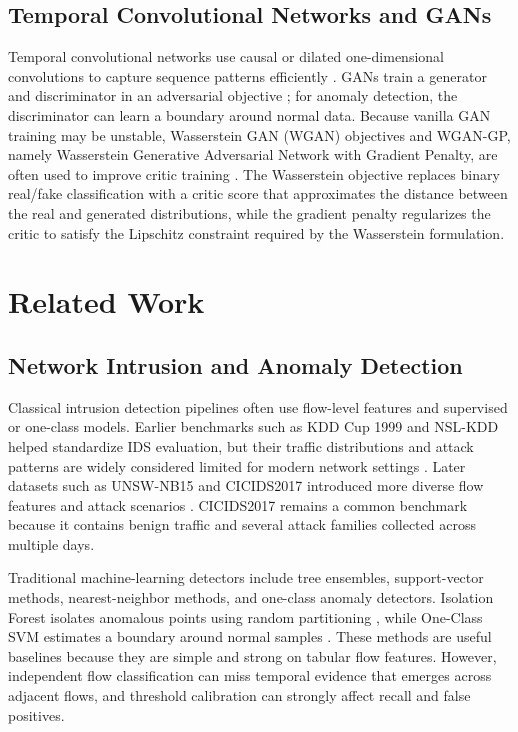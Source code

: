 \documentclass[conference]{IEEEtran}
\begin{document}
\subsection{Temporal Convolutional Networks and GANs}
Temporal convolutional networks use causal or dilated one-dimensional convolutions to capture sequence patterns efficiently \cite{bai2018tcn}. GANs train a generator and discriminator in an adversarial objective \cite{goodfellow2014gan}; for anomaly detection, the discriminator can learn a boundary around normal data. Because vanilla GAN training may be unstable, Wasserstein GAN (WGAN) objectives and WGAN-GP, namely Wasserstein Generative Adversarial Network with Gradient Penalty, are often used to improve critic training \cite{arjovsky2017wgan,gulrajani2017wgangp}. The Wasserstein objective replaces binary real/fake classification with a critic score that approximates the distance between the real and generated distributions, while the gradient penalty regularizes the critic to satisfy the Lipschitz constraint required by the Wasserstein formulation.

\section{Related Work}
\subsection{Network Intrusion and Anomaly Detection}
Classical intrusion detection pipelines often use flow-level features and supervised or one-class models. Earlier benchmarks such as KDD Cup 1999 and NSL-KDD helped standardize IDS evaluation, but their traffic distributions and attack patterns are widely considered limited for modern network settings \cite{tavallaee2009nslkdd}. Later datasets such as UNSW-NB15 and CICIDS2017 introduced more diverse flow features and attack scenarios \cite{moustafa2015unsw,sharafaldin2018cicids}. CICIDS2017 remains a common benchmark because it contains benign traffic and several attack families collected across multiple days.

Traditional machine-learning detectors include tree ensembles, support-vector methods, nearest-neighbor methods, and one-class anomaly detectors. Isolation Forest isolates anomalous points using random partitioning \cite{liu2008iforest}, while One-Class SVM estimates a boundary around normal samples \cite{scholkopf2001ocsvm}. These methods are useful baselines because they are simple and strong on tabular flow features. However, independent flow classification can miss temporal evidence that emerges across adjacent flows, and threshold calibration can strongly affect recall and false positives.
\end{document}
